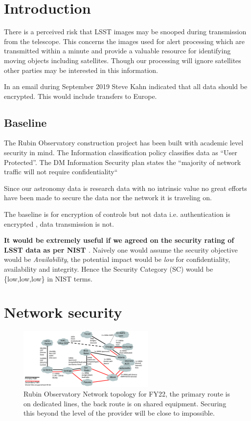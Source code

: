 \section{Introduction} \label{sec:intro}

There is a perceived  risk that LSST  images may be snooped during transmission from the telescope. This concerns the images used for alert processing which are transmitted within a minute and provide a valuable resource for identifying moving objects including satellites. Though our processing will ignore satellites other parties may be interested in this information.

In an email during September 2019 Steve Kahn indicated that all data should be encrypted. This would include transfers to Europe.


\subsection{Baseline }
The Rubin Observatory construction project has been built with academic level security in mind.
The
 Information classification policy  classifies data as  “User Protected”.
The DM Information Security plan  states the “majority of network traffic will not require confidentiality“

Since our astronomy data is research data with no intrinsic value no great efforts have been made to secure the
data nor the network it is traveling on.

The baseline is for encryption of controls but not data i.e. authentication is encrypted , data transmission is not.

{\bf It would be extremely useful if we agreed on the security rating of LSST data as per NIST  \citep{nist800-60}}.
Naively one would assume the security objective would be \emph{Availability}, the potential impact would be \emph{low} for confidentiality, availability and integrity. Hence  the Security Category (SC) would be \{low,low,low\} in NIST terms.




\section{Network security}\label{sec:net}

\begin{figure}
\includegraphics[width=0.6\textwidth]{NetworksFy22}
\caption{Rubin Observatory Network topology for FY22, the primary route is on dedicated lines, the back route is on shared equipment. Securing this beyond the level of the provider will be close to impossible.  \label{fig:net}}
\end{figure}

